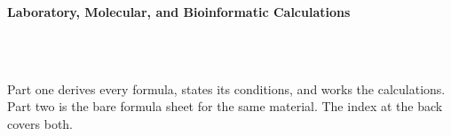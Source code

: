 



\makeindex[title={Index of This Volume},columns=2,intoc]

\begin{titlepage}\thispagestyle{empty}
\vspace*{0.14\textheight}
\noindent{\color{tiercore}\rule{\textwidth}{5pt}}\\[3pt]
\noindent{\color{bioline}\rule{\textwidth}{1pt}}\\[26pt]
\\[12pt]
\noindent\begin{minipage}{\textwidth}\raggedright
{\sffamily\bfseries\fontsize{28}{32}\selectfont\color{bioink}%
 \hyphenchar{} Laboratory, Molecular, and Bioinformatic Calculations\par}\end{minipage}\\[16pt]
\noindent{\color{biogreen}\rule{\textwidth}{1.4pt}}\\[10pt]
\noindent\begin{minipage}{\textwidth}\raggedright
{\fontsize{10.5}{14}\selectfont\color{biogreen}%
Part one derives every formula, states its conditions, and works the calculations. Part two is the
bare formula sheet for the same material. The index at the back covers both.\par}\end{minipage}
\vfill
\noindent{\color{bioline}\rule{\textwidth}{1pt}}\\[3pt]
\noindent{\color{tiercore}\rule{\textwidth}{5pt}}
\end{titlepage}
\tableofcontents
\clearpage
{}
\clearpage
\printindex


